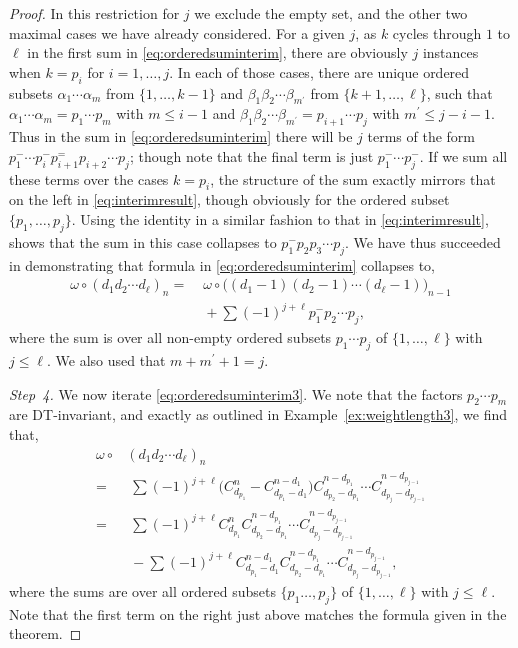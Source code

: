 \documentclass[5p,twocolumn]{elsarticle}
\begin{document}
\begin{proof}
  In this restriction for $j$ we exclude the empty set, and the other two maximal cases we have already considered.
  For a given $j$, as $k$ cycles through $1$ to $\ell$ in the first sum in \eqref{eq:orderedsuminterim}, there are obviously $j$ instances when $k=p_i$ for $i=1,\ldots,j$.
  In each of those cases, there are unique ordered subsets $\alpha_1\cdots\alpha_m$ from $\{1,\ldots,k-1\}$ and $\beta_1\beta_2\cdots\beta_{m^\prime}$ from $\{k+1,\ldots,\ell\}$,
  such that $\alpha_1\cdots\alpha_m=p_1\cdots p_m$ with $m\leqslant i-1$ and $\beta_1\beta_2\cdots\beta_{m^\prime}=p_{i+1}\cdots p_{j}$ with $m^\prime\leqslant j-i-1$.
  Thus in the sum in \eqref{eq:orderedsuminterim} there will be $j$ terms of the form $p_1^-\cdots p_i^-p_{i+1}^=p_{i+2}\cdots p_j$; though note that the final term is just $p_1^-\cdots p_j^-$.
  If we sum all these terms over the cases $k=p_i$, the structure of the sum exactly mirrors that on the left in \eqref{eq:interimresult}, though obviously for the ordered subset $\{p_1,\ldots,p_j\}$.
  Using the identity in a similar fashion to that in \eqref{eq:interimresult}, shows that the sum in this case collapses to $p_1^-p_2p_3\cdots p_j$.
  We have thus succeeded in demonstrating that formula in \eqref{eq:orderedsuminterim} collapses to,
  \begin{align}
    \omega\circ(d_1d_2\cdots d_\ell)_n=&\;\omega\circ\bigl((d_1\!-\!1)(d_2\!-\!1)\cdots(d_\ell\!-\!1)\bigr)_{n-1}\nonumber\\  
                                      &\;+\sum(-1)^{j+\ell}p_1^-p_2\cdots p_j,\label{eq:orderedsuminterim3}
  \end{align}
  where the sum is over all non-empty ordered subsets $p_1\cdots p_j$ of $\{1,\ldots,\ell\}$ with $j\leqslant\ell$.
  We also used that $m+m^\prime+1=j$.
  
  \emph{Step~4.} We now iterate \eqref{eq:orderedsuminterim3}.
  We note that the factors $p_2\cdots p_m$ are DT-invariant, and exactly as outlined in Example~\ref{ex:weightlength3}, we find that,
  \begin{align}
    \omega\circ&(d_1d_2\cdots d_\ell)_n\nonumber\\
                     =&\;\sum(-1)^{j+\ell}\bigl(C_{d_{p_1}}^n-C_{d_{p_1}-d_1}^{n-d_1}\bigr)C_{d_{p_2}-d_{p_1}}^{n-d_{p_1}}\cdots C_{d_{p_j}-d_{p_{j-1}}}^{n-d_{p_{j-1}}}\nonumber\\
                     =&\;\sum(-1)^{j+\ell}C_{d_{p_1}}^nC_{d_{p_2}-d_{p_1}}^{n-d_{p_1}}\cdots C_{d_{p_j}-d_{p_{j-1}}}^{n-d_{p_{j-1}}}\nonumber\\
                      &\;-\sum(-1)^{j+\ell} C_{d_{p_1}-d_1}^{n-d_1}C_{d_{p_2}-d_{p_1}}^{n-d_{p_1}}\cdots C_{d_{p_j}-d_{p_{j-1}}}^{n-d_{p_{j-1}}},\label{eq:step4}
  \end{align}
  where the sums are over all ordered subsets $\{p_1\ldots,p_j\}$ of $\{1,\ldots,\ell\}$ with $j\leqslant\ell$. Note that the first term on the right just above matches the formula given in the theorem.
  

\end{proof}
\end{document}
